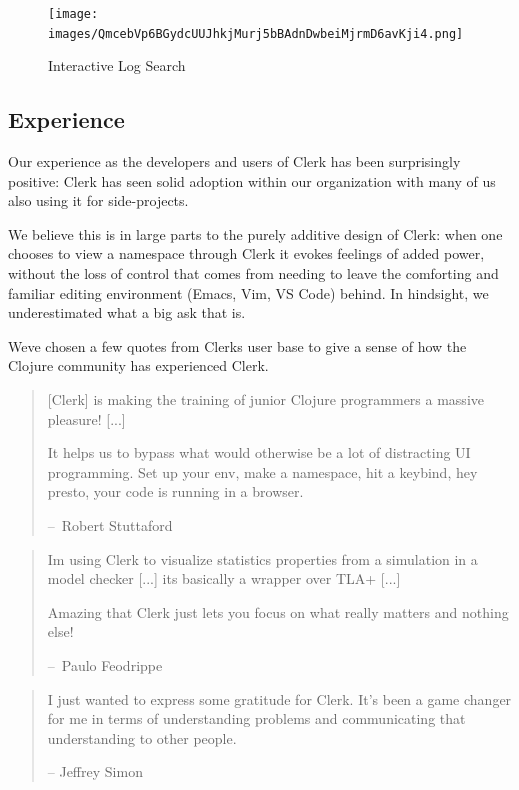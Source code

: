 \documentclass[sigconf,screen]{acmart}
\begin{document}
\begin{figure}
\hypertarget{interactive-log-search}{%
\centering
\texttt{[image: images/QmcebVp6BGydcUUJhkjMurj5bBAdnDwbeiMjrmD6avKji4.png]}
\caption{Interactive Log Search}\label{interactive-log-search}
}
\end{figure}

\hypertarget{experience}{%
\subsection{Experience}\label{experience}}

Our experience as the developers and users of Clerk has been surprisingly positive: Clerk has seen solid adoption within our organization with many of us also using it for side-projects.

We believe this is in large parts to the purely additive design of Clerk: when one chooses to view a namespace through Clerk it evokes feelings of added power, without the loss of control that comes from needing to leave the comforting and familiar editing environment (Emacs, Vim, VS Code) behind. In hindsight, we underestimated what a big ask that is.

We\textquotesingle ve chosen a few quotes from Clerk\textquotesingle s user base to give a sense of how the Clojure community has experienced Clerk.

\begin{quote}
{[}Clerk{]} is making the training of junior Clojure programmers a massive pleasure! {[}...{]}

It helps us to bypass what would otherwise be a lot of distracting UI programming. Set up your env, make a namespace, hit a keybind, hey presto, your code is running in a browser.

--~Robert Stuttaford
\end{quote}

\begin{quote}
I\textquotesingle m using Clerk to visualize statistics properties from a simulation in a model checker {[}...{]} it\textquotesingle s basically a wrapper over TLA+ {[}...{]}

Amazing that Clerk just lets you focus on what really matters and nothing else!

--~Paulo Feodrippe
\end{quote}

\begin{quote}
I just wanted to express some gratitude for Clerk. It's been a game changer for me in terms of understanding problems and communicating that understanding to other people.

-- Jeffrey Simon
\end{quote}
\end{document}
